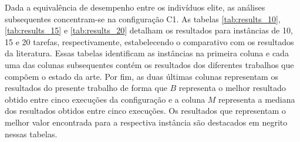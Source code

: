 Dada a equivalência de desempenho entre os indivíduos elite, as análises subsequentes concentram-se na configuração C1. As tabelas \ref{tab:results_10}, \ref{tab:results_15} e \ref{tab:results_20} detalham os resultados para instâncias de 10, 15 e 20 tarefas, respectivamente, estabelecendo o comparativo com os resultados da literatura. Essas tabelas identificam as instâncias na primeira coluna e cada uma das colunas subsequentes contém os resultados dos diferentes trabalhos que compõem o estado da arte. Por fim, as duas últimas colunas representam os resultados do presente trabalho de forma que $B$ representa o melhor resultado obtido entre cinco execuções da configuração e a coluna $M$ representa a mediana dos resultados obtidos entre cinco execuções. Os resultados que representam o melhor valor encontrada para a respectiva instância são destacados em negrito nessas tabelas.

